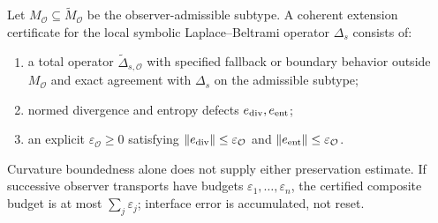 \begin{axiom}
\label{axiom:bk6_laplace_beltrami_observer_extension}
Let $M_{\mathcal O}\subseteq\widetilde M_{\mathcal O}$ be the
observer-admissible subtype.  A coherent extension certificate for the local
symbolic Laplace--Beltrami operator $\Delta_s$ consists of:
\begin{enumerate}
\item a total operator $\widetilde\Delta_{s,\mathcal O}$ with specified
fallback or boundary behavior outside $M_{\mathcal O}$ and exact agreement
with $\Delta_s$ on the admissible subtype;
\item normed divergence and entropy defects $e_{\rm div},e_{\rm ent}$;
\item an explicit $\varepsilon_{\mathcal O}\geq0$ satisfying
$\lVert e_{\rm div}\rVert\leq\varepsilon_{\mathcal O}$ and
$\lVert e_{\rm ent}\rVert\leq\varepsilon_{\mathcal O}$.
\end{enumerate}
Curvature boundedness alone does not supply either preservation estimate.  If
successive observer transports have budgets $\varepsilon_1,\ldots,
\varepsilon_n$, the certified composite budget is at most
$\sum_j\varepsilon_j$; interface error is accumulated, not reset.
\end{axiom}

